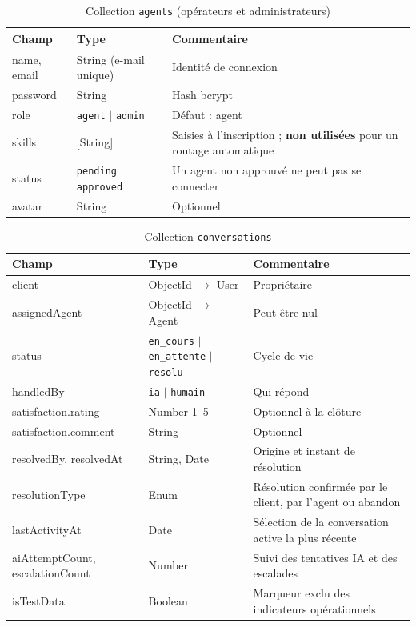 \begin{table}[H]
\centering
\caption{Collection \texttt{agents} (opérateurs et administrateurs)}
\label{tab:agent}
\begin{tabularx}{\textwidth}{|l|l|X|}
\hline
Champ & Type & Commentaire \\
\hline
name, email & String (e-mail unique) & Identité de connexion \\
\hline
password & String & Hash bcrypt \\
\hline
role & \texttt{agent} $\mid$ \texttt{admin} & Défaut : agent \\
\hline
skills & [String] & Saisies à l'inscription ; \textbf{non utilisées} pour un routage automatique \\
\hline
status & \texttt{pending} $\mid$ \texttt{approved} & Un agent non approuvé ne peut pas se connecter \\
\hline
avatar & String & Optionnel \\
\hline
\end{tabularx}
\end{table}

\begin{table}[H]
\centering
\caption{Collection \texttt{conversations}}
\label{tab:conv}
\begin{tabularx}{\textwidth}{|l|l|X|}
\hline
Champ & Type & Commentaire \\
\hline
client & ObjectId $\rightarrow$ User & Propriétaire \\
\hline
assignedAgent & ObjectId $\rightarrow$ Agent & Peut être nul \\
\hline
status & \texttt{en\_cours} $\mid$ \texttt{en\_attente} $\mid$ \texttt{resolu} & Cycle de vie \\
\hline
handledBy & \texttt{ia} $\mid$ \texttt{humain} & Qui répond \\
\hline
satisfaction.rating & Number 1--5 & Optionnel à la clôture \\
\hline
satisfaction.comment & String & Optionnel \\
\hline
resolvedBy, resolvedAt & String, Date & Origine et instant de résolution \\
\hline
resolutionType & Enum & Résolution confirmée par le client, par l'agent ou abandon \\
\hline
lastActivityAt & Date & Sélection de la conversation active la plus récente \\
\hline
aiAttemptCount, escalationCount & Number & Suivi des tentatives IA et des escalades \\
\hline
isTestData & Boolean & Marqueur exclu des indicateurs opérationnels \\
\hline
\end{tabularx}
\end{table}

